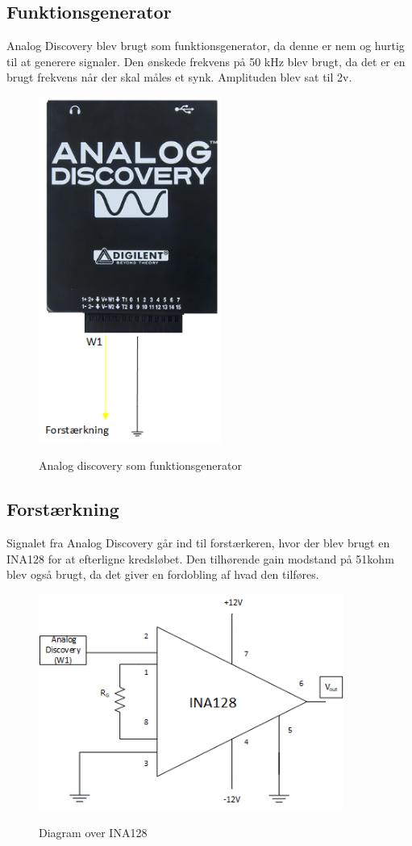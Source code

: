\subsection{Funktionsgenerator}
Analog Discovery blev brugt som funktionsgenerator, da denne er nem og hurtig til at generere signaler. Den ønskede frekvens på 50 kHz blev brugt, da det er en brugt frekvens når der skal måles et synk. Amplituden blev sat til 2v. \cite{Kusuhara2004ImpedanceFunction.}

\begin{figure}[H]
\centering
{\includegraphics[width=6cm]
{Figure/analogdis}}
\caption{Analog discovery som funktionsgenerator}
\label{fig:12vbatteri}
\end{figure}


\subsection{Forstærkning}
Signalet fra Analog Discovery går ind til forstærkeren, hvor der blev brugt en INA128 for at efterligne kredsløbet. Den tilhørende gain modstand på 51kohm blev også brugt, da det giver en fordobling af hvad den tilføres.

\begin{figure}[H]
\centering
{\includegraphics[width=10cm]
{Figure/ina128}}
\caption{Diagram over INA128}
\label{fig:12vbatteri}
\end{figure}







